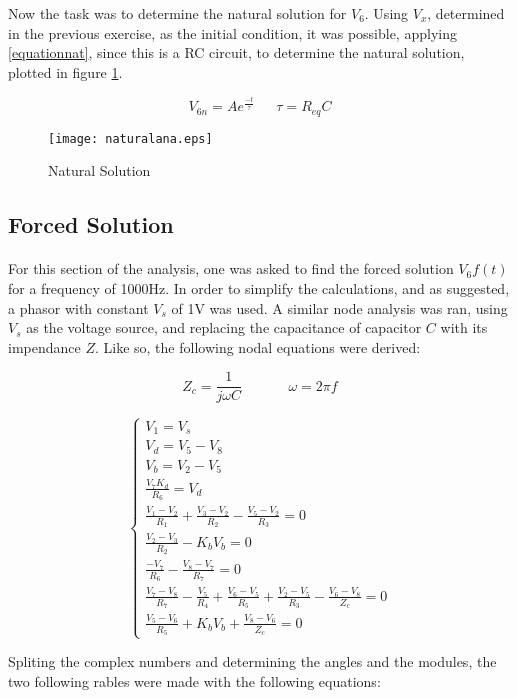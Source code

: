\par Now the task was to determine the natural solution for $V_6$. Using $V_x$, determined in the previous exercise, as the initial condition, it was possible, applying \ref{equationnat}, since this is a RC circuit, to determine the natural solution, plotted in figure \ref{natural ana}.

\begin{equation}
	V_{6n} = A e^{\frac{-t}{\tau}}  \ \ \  \ \ \ \ \tau = R_{eq} C
	\label{equationnat}
\end{equation}



\begin{figure}[H]
    \texttt{[image: naturalana.eps]}
    \centering
    \caption{Natural Solution}
    \label{natural ana}
\end{figure}

\subsection{Forced Solution}
\paragraph{}

\par For this section of the analysis, one was asked to find the forced solution $V_{6}f(t)$ for a frequency of 1000Hz. In order to simplify the calculations, and as suggested, a phasor with constant $V_s$ of 1V was used.
A similar node analysis was ran, using $V_s$ as the voltage source, and replacing the capacitance of capacitor $C$ with its impendance $Z$. Like so, the following nodal equations were derived:

\begin{equation}
	Z_c = \frac{1}{j \omega C}     \ \ \  \ \ \ \ \  \ \ \ \ \ \ \ \omega = 2 \pi f
\end{equation}


$$
\begin{cases} 
	V_1 = V_s \\ 
	V_d = V_5 -V_8 \\
	V_b = V_2 - V_5 \\
	\frac{V_7 K_d}{R_6} = V_d \\ 
	\frac{V_1 - V_2}{R_1} + \frac{V_3 - V_2}{R_2} - \frac{V_5 - V_2}{R_3}  = 0 \\
	\frac{V_2 - V_3}{R_2} - K_b V_b = 0 \\
	\frac{-V_7}{R_6} -\frac{V_8 - V_7}{R_7} = 0 \\
	\frac{V_7 - V_8}{R_7} - \frac{V_5}{R_4} + \frac{V_6 - V_5}{R_5} + \frac{V_2 - V_5}{R_3} - \frac{V_6 - V_8}{Z_c}= 0 \\
	\frac{V_5 - V_6}{R_5} + K_b V_b + \frac{V_8 - V_6}{Z_c}= 0 
\label{system 4}
\end{cases}
$$
\par Spliting the complex numbers and determining the angles and the modules, the two following rables were made with the following equations:

